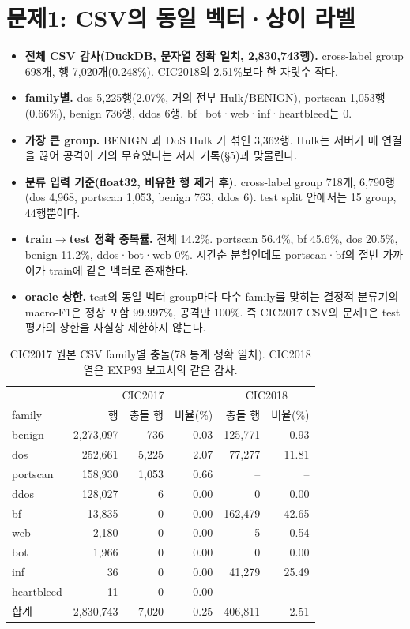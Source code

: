\section{문제1: CSV의 동일 벡터·상이 라벨}
\begin{itemize}
\item \textbf{전체 CSV 감사(DuckDB, 문자열 정확 일치, 2,830,743행).} cross-label group 698개, 행 7,020개(0.248\%). CIC2018의 2.51\%보다 한 자릿수 작다.
\item \textbf{family별.} dos 5,225행(2.07\%, 거의 전부 Hulk/BENIGN), portscan 1,053행(0.66\%), benign 736행, ddos 6행. bf·bot·web·inf·heartbleed는 0.
\item \textbf{가장 큰 group.} BENIGN 과 DoS Hulk 가 섞인 3,362행. Hulk는 서버가 매 연결을 끊어 공격이 거의 무효였다는 저자 기록(\S5)과 맞물린다.
\item \textbf{분류 입력 기준(float32, 비유한 행 제거 후).} cross-label group 718개, 6,790행(dos 4,968, portscan 1,053, benign 763, ddos 6). test split 안에서는 15 group, 44행뿐이다.
\item \textbf{train$\to$test 정확 중복률.} 전체 14.2\%. portscan 56.4\%, bf 45.6\%, dos 20.5\%, benign 11.2\%, ddos·bot·web 0\%. 시간순 분할인데도 portscan·bf의 절반 가까이가 train에 같은 벡터로 존재한다.
\item \textbf{oracle 상한.} test의 동일 벡터 group마다 다수 family를 맞히는 결정적 분류기의 macro-F1은 정상 포함 99.997\%, 공격만 100\%. 즉 CIC2017 CSV의 문제1은 test 평가의 상한을 사실상 제한하지 않는다.
\end{itemize}

\begin{table}[H]
\centering\small
\caption{CIC2017 원본 CSV family별 충돌(78 통계 정확 일치). CIC2018 열은 EXP93 보고서의 같은 감사.}
\begin{tabular}{lrrr|rr}
\toprule & \multicolumn{3}{c|}{CIC2017} & \multicolumn{2}{c}{CIC2018}\\
family & 행 & 충돌 행 & 비율(\%) & 충돌 행 & 비율(\%)\\\midrule
benign & 2,273,097 & 736 & 0.03 & 125,771 & 0.93\\
dos & 252,661 & 5,225 & 2.07 & 77,277 & 11.81\\
portscan & 158,930 & 1,053 & 0.66 & -- & --\\
ddos & 128,027 & 6 & 0.00 & 0 & 0.00\\
bf & 13,835 & 0 & 0.00 & 162,479 & 42.65\\
web & 2,180 & 0 & 0.00 & 5 & 0.54\\
bot & 1,966 & 0 & 0.00 & 0 & 0.00\\
inf & 36 & 0 & 0.00 & 41,279 & 25.49\\
heartbleed & 11 & 0 & 0.00 & -- & --\\\midrule
합계 & 2,830,743 & 7,020 & 0.25 & 406,811 & 2.51\\
\bottomrule
\end{tabular}
\end{table}

